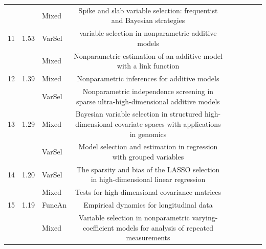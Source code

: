 \documentclass{article}
\begin{document}
\begin{landscape}
\begin{table}[t]
\begin{tabular}{lclclclcl}
     &                           & Mixed     & Spike and slab variable selection: frequentist and Bayesian strategies                        &                                                             \\
11   & 1.53                      & VarSel    & variable selection in nonparametric additive models                                           &                                                             \\
     &                           & Mixed     & Nonparametric estimation of an additive model with a link function                            &                                                             \\
12   & 1.39                      & Mixed     & Nonparametric inferences for additive models                                                  &                                                             \\
     &                           & VarSel    & Nonparametric independence screening in sparse ultra-high-dimensional additive models         &                                                             \\
13   & 1.29                      & Mixed     & Bayesian variable selection in structured high-dimensional covariate spaces with applications in genomics &                                                             \\
     &                           & VarSel    & Model selection and estimation in regression with grouped variables                           &                                                             \\
14   & 1.20                      & VarSel    & The sparsity and bias of the LASSO selection in high-dimensional linear regression            &                                                             \\
     &                           & Mixed     & Tests for high-dimensional covariance matrices                                                &                                                             \\
15   & 1.19                      & FuncAn    & Empirical dynamics for longitudinal data                                                      &                                                             \\
     &                           & Mixed     & Variable selection in nonparametric varying-coefficient models for analysis of repeated measurements      &                               \\\hline                         
\end{tabular}
\end{table}
\end{landscape}



\end{document}
